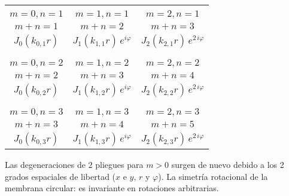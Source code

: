 \begin{table}[H]
\begin{tabular}{c@{\hskip 3cm} c@{\hskip 3cm} c@{\hskip 3cm}}
 &  & 
 \\
$m = 0, n = 1$ & $m = 1, n = 1$ & $m = 2, n = 1$\\
$m + n = 1$ & $m + n = 2$ & $m + n = 3$ \\
$J_{0}(k_{0,1} r)$ &  $J_{1}(k_{1,1} r) \, e^{i \varphi}$ & $J_{2}(k_{2,1} r) \, e^{2 \, i \varphi}$ \\ 
\multicolumn{3}{c}{} \\
 &  & 
 \\
$m = 0, n = 2$ & $m = 1, n = 2$ & $m = 2, n = 2$\\
$m + n = 2$ & $m + n = 3$ & $m + n = 4$ \\
$J_{0}(k_{0,2} r)$ &  $J_{1}(k_{1,2} r) \, e^{i \varphi}$ & $J_{2}(k_{2,2} r) \, e^{2 \, i \varphi}$ \\
\multicolumn{3}{c}{} \\
 &  & 
 \\
$m = 0, n = 3$ & $m = 1, n = 3$ & $m = 2, n = 3$\\
$m + n = 3$ & $m + n = 4$ & $m + n = 5$ \\
$J_{0}(k_{0,3} r)$ &  $J_{1}(k_{1,3} r) \, e^{i \varphi}$ & $J_{2}(k_{2,3} r) \, e^{2 \, i \varphi}$
\end{tabular}
\end{table}

\newpage
Las degeneraciones de 2 pliegues para $m > 0$ surgen de nuevo debido a los 2 grados espaciales de libertad ($x$ e $y$, $r$ y $\varphi$). La simetría rotacional de la membrana circular: es invariante en rotaciones arbitrarias.
